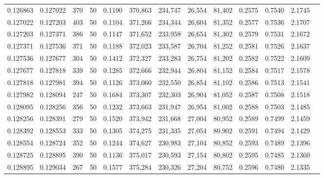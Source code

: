 \begin{tabular}{rrrrrrrrrrrrr}
0.126863 & 0.127022 &   370 &  50 &                                     0.1190 & 370,863 & 234,747 &  26,554 &  81,402 & 0.2575 & 0.7540 & 2.1745 \\
0.127022 & 0.127203 &   403 &  50 &                                     0.1104 & 371,266 & 234,344 &  26,604 &  81,352 & 0.2577 & 0.7536 & 2.1707 \\
0.127203 & 0.127371 &   386 &  50 &                                     0.1147 & 371,652 & 233,958 &  26,654 &  81,302 & 0.2579 & 0.7531 & 2.1672 \\
0.127371 & 0.127536 &   371 &  50 &                                     0.1188 & 372,023 & 233,587 &  26,704 &  81,252 & 0.2581 & 0.7526 & 2.1637 \\
0.127536 & 0.127677 &   304 &  50 &                                     0.1412 & 372,327 & 233,283 &  26,754 &  81,202 & 0.2582 & 0.7522 & 2.1609 \\
0.127677 & 0.127818 &   339 &  50 &                                     0.1285 & 372,666 & 232,944 &  26,804 &  81,152 & 0.2584 & 0.7517 & 2.1578 \\
0.127818 & 0.127981 &   394 &  50 &                                     0.1126 & 373,060 & 232,550 &  26,854 &  81,102 & 0.2586 & 0.7513 & 2.1541 \\
0.127982 & 0.128094 &   247 &  50 &                                     0.1684 & 373,307 & 232,303 &  26,904 &  81,052 & 0.2587 & 0.7508 & 2.1518 \\
0.128095 & 0.128256 &   356 &  50 &                                     0.1232 & 373,663 & 231,947 &  26,954 &  81,002 & 0.2588 & 0.7503 & 2.1485 \\
0.128256 & 0.128391 &   279 &  50 &                                     0.1520 & 373,942 & 231,668 &  27,004 &  80,952 & 0.2589 & 0.7499 & 2.1459 \\
0.128392 & 0.128553 &   333 &  50 &                                     0.1305 & 374,275 & 231,335 &  27,054 &  80,902 & 0.2591 & 0.7494 & 2.1429 \\
0.128554 & 0.128724 &   352 &  50 &                                     0.1244 & 374,627 & 230,983 &  27,104 &  80,852 & 0.2593 & 0.7489 & 2.1396 \\
0.128725 & 0.128895 &   390 &  50 &                                     0.1136 & 375,017 & 230,593 &  27,154 &  80,802 & 0.2595 & 0.7485 & 2.1360 \\
0.128895 & 0.129034 &   267 &  50 &                                     0.1577 & 375,284 & 230,326 &  27,204 &  80,752 & 0.2596 & 0.7480 & 2.1335 \\

\end{tabular}
